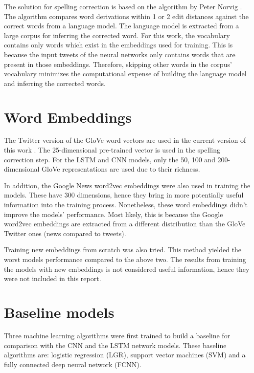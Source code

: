 \documentclass[10pt,conference,compsocconf]{IEEEtran}
\begin{document}
The solution for spelling correction is based on the algorithm by Peter Norvig \cite{spelling_corrector}. The algorithm compares word derivations within 1 or 2 edit distances against the correct words from a language model. The language model is extracted from a large corpus for inferring the corrected word. For this work, the vocabulary contains only words which exist in the embeddings used for training. This is because the input tweets of the neural networks only contains words that are present in those embeddings. Therefore, skipping other words in the corpus' vocabulary minimizes the computational expense of building the language model and inferring the corrected words.

\section{Word Embeddings}
\label{sec:embeddings}

The Twitter version of the GloVe word vectors are used in the current version of this work \cite{glove_twitter}. The 25-dimensional pre-trained vector is used in the spelling correction step. For the LSTM and CNN models, only the 50, 100 and 200-dimensional GloVe representations are used due to their richness. 

In addition, the Google News word2vec embeddings were also used in training the models. These have 300 dimensions, hence they bring in more potentially useful information into the training process. Nonetheless, these word embeddings didn't improve the models' performance. Most likely, this is because the Google word2vec embeddings are extracted from a different distribution than the GloVe Twitter ones (news compared to tweets).

Training new embeddings from scratch was also tried. This method yielded the worst models performance compared to the above two. The results from training the models with new embeddings is not considered useful information, hence they were not included in this report.

\section{Baseline models}
\label{sec:baselines}

Three machine learning algorithms were first trained to build a baseline for comparison with the CNN and the LSTM network models. These baseline algorithms are: logistic regression (LGR), support vector machines (SVM) and a fully connected deep neural network (FCNN). 
\end{document}

